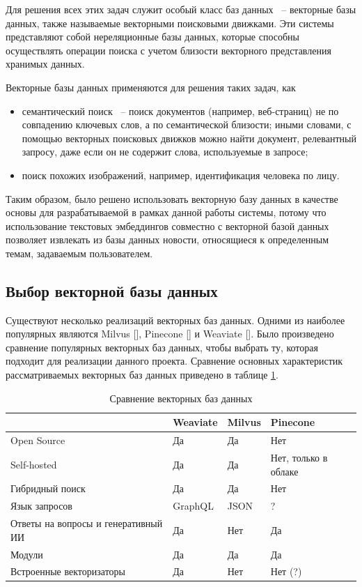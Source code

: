 Для решения всех этих задач служит особый класс баз данных ~-- векторные базы данных, также называемые векторными поисковыми движками. Эти системы представляют собой нереляционные базы данных, которые способны осуществлять операции поиска с учетом близости векторного представления хранимых данных.

Векторные базы данных применяются для решения таких задач, как
\begin{itemize}
    \item семантический поиск ~-- поиск документов (например, веб-страниц) не по совпадению ключевых слов, а по семантической близости; иными словами, с помощью векторных поисковых движков можно найти документ, релевантный запросу, даже если он не содержит слова, используемые в запросе;
    \item поиск похожих изображений, например, идентификация человека по лицу.
\end{itemize}

Таким образом, было решено использовать векторную базу данных в качестве основы для разрабатываемой в рамках данной работы системы, потому что использование текстовых эмбеддингов совместно с векторной базой данных позволяет извлекать из базы данных новости, относящиеся к определенным темам, задаваемым пользователем.

\subsection{Выбор векторной базы данных}

Существуют несколько реализаций векторных баз данных. Одними из наиболее популярных являются Milvus [\cite{milvus}], Pinecone [\cite{pinecone}] и Weaviate [\cite{weaviate}]. Было произведено сравнение популярных векторных баз данных, чтобы выбрать ту, которая подходит для реализации данного проекта. Сравнение основных характеристик рассматриваемых векторных баз данных приведено в таблице \ref{tab:vector-db-compare}.

\begin{table}[ht]
    \caption{Сравнение векторных баз данных}
    \label{tab:vector-db-compare}
    \begin{tabularx}{\textwidth}{|l|X|X|X|}
        \hline
        & Weaviate & Milvus & Pinecone \\
        \hline
        Open Source & Да & Да & Нет \\
        \hline
        Self-hosted & Да & Да & Нет, только в облаке \\
        \hline
        Гибридный поиск & Да & Да & Нет \\
        \hline
        Язык запросов & GraphQL & JSON &  ? \\
        \hline
        Ответы на вопросы и генеративный ИИ & Да & Нет & Да \\
        \hline
        Модули & Да & Да & Да \\
        \hline
        Встроенные векторизаторы & Да & Нет & Нет (?) \\
        \hline
    \end{tabularx}
\end{table}

